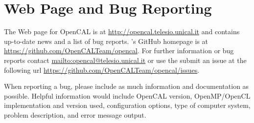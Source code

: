\section{Web Page and Bug Reporting}

The Web page for OpenCAL is at \url{http://opencal.telesio.unical.it} and
contains up-to-date news and a list of bug reports. \ocal's GitHub
homepage is at \url{https://github.com/OpenCALTeam/opencal}. For
further information or bug reports contact
\url{mailto:opencal@telesio.unical.it} or use the submit an issue at the
following url \url{https://github.com/OpenCALTeam/opencal/issues}.

When reporting a bug, please include as much information and
documentation as possible. Helpful information would include OpenCAL
version, OpenMP/OpenCL implementation and version used,
configuration options, type of computer system, problem description,
and error message output.
